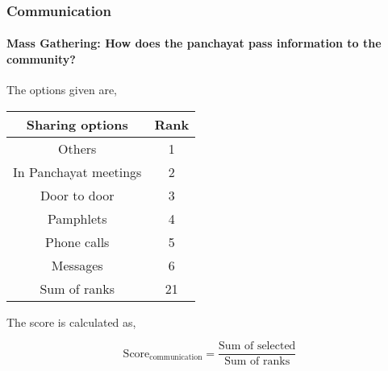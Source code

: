 \documentclass[oneside,twocolumn]{article}
\newcommand{\tsub}[2]{\text{#1}_{\text{#2}}}
\newcommand{\dsub}[2]{\dfrac{\text{#1}}{\text{#2}}}
\newcommand{\multsel}[1]
{
	\[
		\tsub{Score}{#1} = \dsub{Sum of selected}{Sum of ranks}
	\]
}
\newenvironment{ttable}
{
\begin{center}
\begin{tabular}{c|c}
\hline
}
{
\\ \hline
\end{tabular}
\end{center}
}
\begin{document}
\subsubsection{Communication}
\paragraph{Mass Gathering: How does the panchayat pass information to the community?}
The options given are,
\begin{ttable}
	Sharing options & Rank \\ \hline
	Others & 1 \\
	In Panchayat meetings & 2 \\
	Door to door & 3 \\
	Pamphlets & 4 \\
	Phone calls & 5 \\
	Messages & 6 \\ \hline
	Sum of ranks & 21
\end{ttable}
The score is calculated as,
\multsel{communication}
\end{document}
